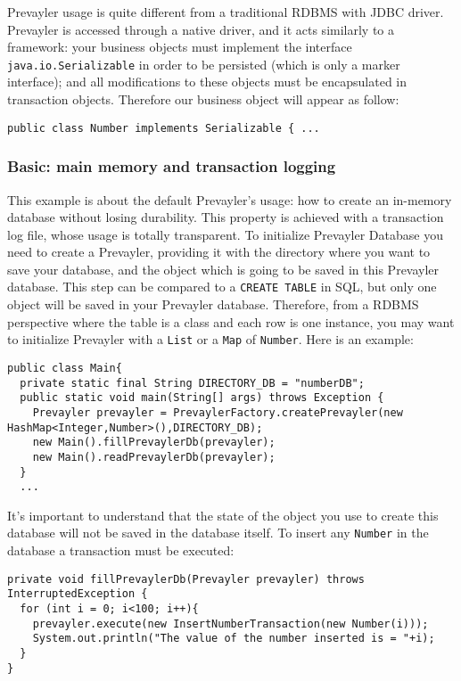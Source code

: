 			Prevayler usage is quite different from a traditional RDBMS with JDBC driver. Prevayler is accessed 
			through a native driver, and it acts similarly to a framework: your business objects must implement 
			the interface \lstinline!java.io.Serializable! in order to be persisted (which is only a marker interface); 
			and all modifications to these objects must be encapsulated in transaction objects. Therefore our 
			business object will appear as follow:	
			\begin{lstlisting} 
public class Number implements Serializable { ...
   		\end{lstlisting} 		
			
			\subsubsection{Basic: main memory and transaction logging}	
			This example is about the default Prevayler's usage: how to create an in-memory database 
			without losing durability. This property is achieved with a transaction log file, whose usage 
			is totally transparent.
			To initialize Prevayler Database you need to create a Prevayler, providing it with 
			the directory where you want to save your database, and the object which is going to be saved in 
			this Prevayler database. This step can be compared 
			to a \lstinline!CREATE TABLE! in SQL, but only one object will be saved in your Prevayler database. 
			Therefore, from a RDBMS perspective where the table is a class and each row is one instance, 
			you may want to initialize Prevayler with a \lstinline!List! or a \lstinline!Map! 
			of \lstinline!Number!. Here is an example:
			\begin{lstlisting}
public class Main{
  private static final String DIRECTORY_DB = "numberDB";
  public static void main(String[] args) throws Exception {
    Prevayler prevayler = PrevaylerFactory.createPrevayler(new HashMap<Integer,Number>(),DIRECTORY_DB);		
    new Main().fillPrevaylerDb(prevayler);
    new Main().readPrevaylerDb(prevayler);
  }
  ...
			\end{lstlisting}			
			
			It's important to understand that the state of the object you use 
			to create this database will not be saved in the database itself. To insert any \lstinline!Number! 
			in the database a transaction must be executed:
			\begin{lstlisting} 
private void fillPrevaylerDb(Prevayler prevayler) throws InterruptedException {		
  for (int i = 0; i<100; i++){			
    prevayler.execute(new InsertNumberTransaction(new Number(i)));			
    System.out.println("The value of the number inserted is = "+i);
  }
}
			\end{lstlisting}
		
